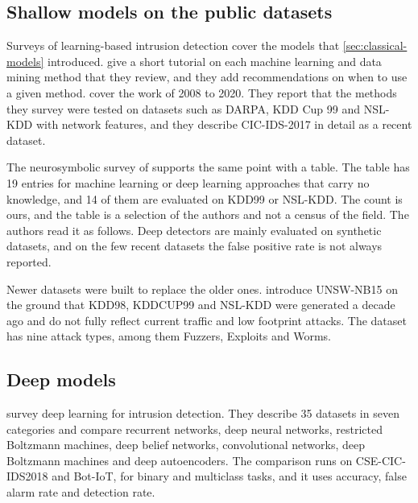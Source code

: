\subsection{Shallow models on the public datasets}
\label{sec:shallow-nids}

Surveys of learning-based intrusion detection cover the models that
\cref{sec:classical-models} introduced. \citet{buczak2016survey} give a short
tutorial on each machine learning and data mining method that they review, and
they add recommendations on when to use a given method.
\citet{thakkar2022survey} cover the work of 2008 to 2020. They report that the
methods they survey were tested on datasets such as DARPA, KDD Cup 99 and
NSL-KDD with network features, and they describe CIC-IDS-2017 in detail as a
recent dataset.

The neurosymbolic survey of \citet{bizzarri2025survey} supports the same point
with a table. The table has 19 entries for machine learning or deep learning
approaches that carry no knowledge, and 14 of them are evaluated on KDD99 or
NSL-KDD. The count is ours, and the table is a selection of the authors and not
a census of the field. The authors read it as follows. Deep detectors are
mainly evaluated on synthetic datasets, and on the few recent datasets the
false positive rate is not always reported.

Newer datasets were built to replace the older ones.
\citet{moustafa2015unswnb15} introduce UNSW-NB15 on the ground that KDD98,
KDDCUP99 and NSL-KDD were generated a decade ago and do not fully reflect
current traffic and low footprint attacks. The dataset has nine attack types,
among them Fuzzers, Exploits and Worms.

\subsection{Deep models}
\label{sec:deep-nids}

\citet{ferrag2020deep} survey deep learning for intrusion detection. They
describe 35 datasets in seven categories and compare recurrent networks, deep
neural networks, restricted Boltzmann machines, deep belief networks,
convolutional networks, deep Boltzmann machines and deep autoencoders. The
comparison runs on CSE-CIC-IDS2018 and Bot-IoT, for binary and multiclass
tasks, and it uses accuracy, false alarm rate and detection rate.

